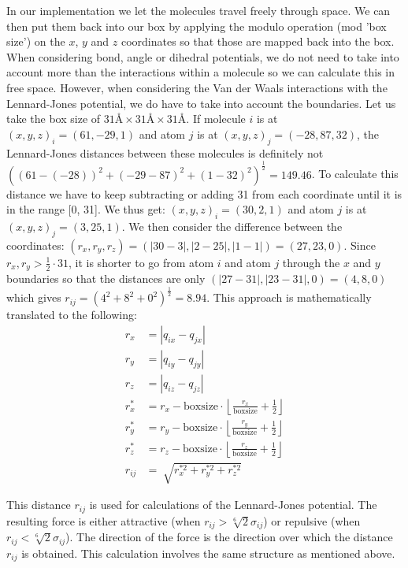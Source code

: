 \documentclass[11pt,a4paper]{article}
\begin{document}
In our implementation we let the molecules travel freely through space. We can then put them back into our box by applying the modulo operation (mod 'box size') on the $x$, $y$ and $z$ coordinates so that those are mapped back into the box. When considering bond, angle or dihedral potentials, we do not need to take into account more than the interactions within a molecule so we can calculate this in free space. However, when considering the Van der Waals interactions with the Lennard-Jones potential, we do have to take into account the boundaries. Let us take the box size of $31\text{\AA} \times 31\text{\AA} \times 31\text{\AA}$. If molecule $i$ is at $(x, y, z)_i = (61, -29, 1)$ and atom $j$ is at $(x, y, z)_j = (-28, 87, 32)$, the Lennard-Jones distances between these molecules is definitely not $((61-(-28))^2+(-29-87)^2+(1-32)^2)^{\frac{1}{2}} = 149.46$. To calculate this distance we have to keep subtracting or adding 31 from each coordinate until it is in the range [0, 31]. We thus get: $(x, y, z)_i = (30, 2, 1)$ and atom $j$ is at $(x, y, z)_j = (3, 25, 1)$. We then consider the difference between the coordinates: $(r_x, r_y, r_z) = (|30-3|, |2-25|, |1-1|) = (27, 23, 0)$. Since $r_x, r_y > \frac{1}{2}\cdot 31$, it is shorter to go from atom $i$ and atom $j$ through the $x$ and $y$ boundaries so that the distances are only $(|27-31|, |23-31|, 0) = (4, 8, 0)$ which gives $r_{ij} = (4^2 + 8^2 + 0^2)^{\frac{1}{2}} = 8.94$. This approach is mathematically translated to the following:
\begin{align*}
r_x &= |q_{ix} - q_{jx}| \\
r_y &= |q_{iy} - q_{jy}| \\
r_z &= |q_{iz} - q_{jz}| \\
r_x^* &= r_x - \text{boxsize}\cdot \left \lfloor{\frac{r_x}{\text{boxsize}}+\frac{1}{2}}\right \rfloor \\
r_y^* &= r_y - \text{boxsize}\cdot \left \lfloor{\frac{r_y}{\text{boxsize}}+\frac{1}{2}}\right \rfloor \\
r_z^* &= r_z - \text{boxsize}\cdot \left \lfloor{\frac{r_z}{\text{boxsize}}+\frac{1}{2}}\right \rfloor \\
r_{ij} &= \sqrt[]{r_x^{*2}+r_y^{*2}+r_z^{*2}}
\end{align*}

This distance $r_{ij}$ is used for calculations of the Lennard-Jones potential. The resulting force is either attractive (when $r_{ij} > \sqrt[6]{2}\sigma_{ij}$) or repulsive (when $r_{ij} < \sqrt[6]{2}\sigma_{ij}$). The direction of the force is the direction over which the distance $r_{ij}$ is obtained. This calculation involves the same structure as mentioned above. 
\end{document}

